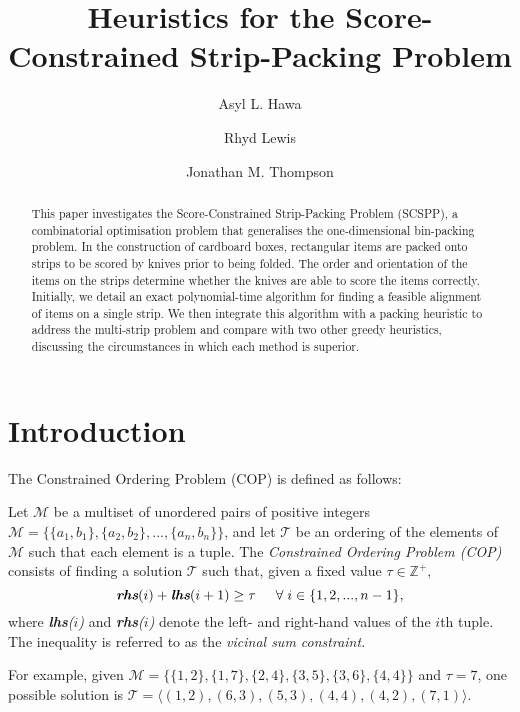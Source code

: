 \documentclass[runningheads]{llncs}
\begin{document}
	
\title{Heuristics for the Score-Constrained Strip-Packing Problem}
\author{Asyl L. Hawa \and Rhyd Lewis \and Jonathan M. Thompson}
\maketitle

\begin{abstract}
	This paper investigates the Score-Constrained Strip-Packing Problem (SCSPP), a combinatorial optimisation problem that generalises the one-dimensional bin-packing problem. In the construction of cardboard boxes, rectangular items are packed onto strips to be scored by knives prior to being folded. The order and orientation of the items on the strips determine whether the knives are able to score the items correctly. Initially, we detail an exact polynomial-time algorithm for finding a feasible alignment of items on a single strip. We then integrate this algorithm with a packing heuristic to address the multi-strip problem and compare with two other greedy heuristics, discussing the circumstances in which each method is superior.
\end{abstract}

\section{Introduction}
\label{sec:intro}
The Constrained Ordering Problem (COP) is defined as follows:

\begin{definition}
	\label{defn:cop}
	Let $\mathcal{M}$ be a multiset of unordered pairs of positive integers\\ $\mathcal{M} = \{\{a_1, b_1\}, \{a_2,b_2\},...,\{a_n,b_n\}\}$, and let $\mathcal{T}$ be an ordering of the elements of $\mathcal{M}$ such that each element is a tuple. The \emph{Constrained Ordering Problem (COP)} consists of finding a solution $\mathcal{T}$ such that, given a fixed value $\tau \in \mathbb{Z}^{+},$
	\begin{equation}
		\label{eqn:vsc}
		\emph{\textbf{rhs}}(i) + \emph{\textbf{lhs}}(i+1) \geq \tau \hspace{5mm} \forall \hspace{1mm} i \in \{1,2,..., n-1\},
	\end{equation}
	where \emph{\textbf{lhs}($i$)} and \emph{\textbf{rhs}($i$)} denote the left- and right-hand values of the $i$th tuple. The inequality is referred to as the \emph{vicinal sum constraint}.
\end{definition}
For example, given $\mathcal{M} = \{\{1,2\}, \{1,7\}, \{2,4\}, \{3,5\}, \{3,6\}, \{4,4\}\}$ and $\tau = 7$, one possible solution is $\mathcal{T} = \langle(1,2), (6,3), (5,3), (4,4), (4,2), (7,1) \rangle$.
\end{document}
